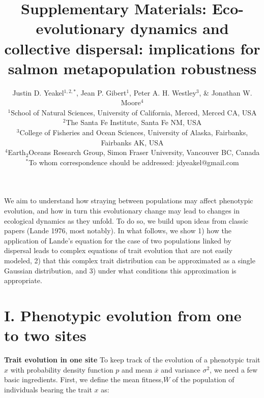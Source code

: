 \documentclass{revtex4}
\newcommand{\beginsupplement}{%
        \clearpage
        \setcounter{table}{0}
        \renewcommand{\thetable}{S\arabic{table}}%
        \setcounter{figure}{0}
        \renewcommand{\thefigure}{S\arabic{figure}}%
     }
\begin{document}
\title{Supplementary Materials: Eco-evolutionary dynamics and collective dispersal: implications for salmon metapopulation robustness}
\author{
Justin D. Yeakel${}^{1,2,*}$, Jean P. Gibert${}^{1}$, Peter A. H. Westley${}^{3}$, \& Jonathan W. Moore${}^{4}$ \\
${}^1$School of Natural Sciences, University of California, Merced, Merced CA, USA \\
${}^2$The Santa Fe Institute, Santa Fe NM, USA \\
${}^3$College of Fisheries and Ocean Sciences, University of Alaska, Fairbanks, Fairbanks AK, USA \\
${}^4$Earth${}_2$Oceans Research Group, Simon Fraser University, Vancouver BC, Canada \\
${}^*$To whom correspondence should be addressed: jdyeakel@gmail.com
}

\maketitle

\beginsupplement

We aim to understand how straying between populations may affect phenotypic evolution, and how in turn this evolutionary change may lead to changes in ecological dynamics as they unfold. 
To do so, we build upon ideas from classic papers (Lande 1976, most notably). 
In what follows, we show 
1) how the application of Lande's equation for the case of two populations linked by dispersal leads to complex equations of trait evolution that are not easily modeled,
2) that this complex trait distribution can be approximated as a single Gaussian distribution, and
3) under what conditions this approximation is appropriate.

\section*{I. Phenotypic evolution from one to two sites}

\textbf{Trait evolution in one site} To keep track of the evolution of a phenotypic trait $x$ with probability density function $p$ and mean $\overline{x}$ and variance $\sigma^{2}$, we need a few basic ingredients. First, we define the mean fitness,$\overline{W}$ of the population of individuals bearing the trait $x$ as:
\end{document}
